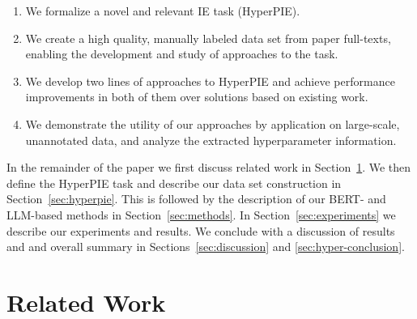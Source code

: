 \begin{enumerate}
    \item We formalize a novel and relevant IE task (HyperPIE).
    \item We create a high quality, manually labeled data set from paper full-texts, enabling the development and study of approaches to the task.
    \item We develop two lines of approaches to HyperPIE and achieve performance improvements in both of them over solutions based on existing work.
    \item We demonstrate the utility of our approaches by application on large-scale, unannotated data, and analyze the extracted hyperparameter information.
\end{enumerate}

In the remainder of the paper we first discuss related work in Section~\ref{sec:refwork}. We then define the HyperPIE task and describe our data set construction in Section~\ref{sec:hyperpie}. This is followed by the description of our BERT- and LLM-based methods in Section~\ref{sec:methods}. In Section~\ref{sec:experiments} we describe our experiments and results. We conclude with a discussion of results and and overall summary in Sections~\ref{sec:discussion} and \ref{sec:hyper-conclusion}.


\section{Related Work}\label{sec:refwork}



